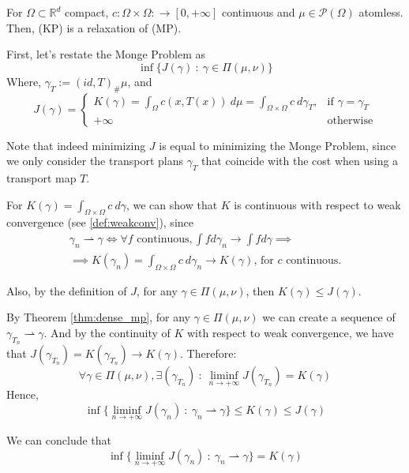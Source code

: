 \begin{theorem}
  For $\Omega \subset \mathbb R^d$ compact,
  $c:\Omega\times \Omega: \to [0,+\infty]$ continuous and
  $\mu \in \mathcal P(\Omega)$ atomless. Then, (KP) is a relaxation
  of (MP).
\end{theorem}
\begin{prf}
  First, let's restate the Monge Problem as
  \begin{equation*}
    \inf \{J(\gamma) \ : \ \gamma \in \Pi(\mu,\nu)\}
  \end{equation*}
  Where, $\gamma_T := (id,T)_\# \mu$, and
  \begin{equation*}
    J(\gamma)  =
    \begin{cases}
      K(\gamma)=
      \int_{\Omega} c(x,T(x)) \ d\mu =
      \int_{\Omega \times \Omega}c \ d\gamma_T,
              & \text{if } \gamma = \gamma_T \\
      +\infty & \text{otherwise}
    \end{cases}
  \end{equation*}

  Note that indeed minimizing $J$ is equal to minimizing the
  Monge Problem, since we only consider the transport plans
  $\gamma_T$ that coincide with the cost when using a transport map
  $T$.

  For $K(\gamma) = \int_{\Omega \times \Omega} c \ d\gamma$,
  we can show that $K$ is continuous with respect to weak convergence (see \ref{def:weakconv}), since
  \begin{align*}
    \gamma_n \rightharpoonup \gamma \iff
    \forall f \text{ continuous}, \int f d\gamma_n \to \int f d\gamma
    \implies
    \\
    \implies
    K(\gamma_n) = \int_{\Omega \times \Omega} c \ d\gamma_n \to
    K(\gamma)\text{, for } c \text{ continuous.}
  \end{align*}

  Also, by the definition of $J$, for any $\gamma \in \Pi(\mu,\nu)$, then $K(\gamma) \leq J(\gamma)$.

  By Theorem \ref{thm:dense_mp}, for any
  $\gamma \in \Pi(\mu,\nu)$ we can create a sequence of
  $\gamma_{T_n}\rightharpoonup \gamma$. And by the continuity
  of $K$ with respect to weak convergence, we have that $J(\gamma_{T_n})=K(\gamma_{T_n})\to
    K(\gamma)$. Therefore:
  \begin{equation*}
    \forall \gamma \in \Pi(\mu,\nu), \exists (\gamma_{T_n})\ : \
    \liminf_{n\to +\infty} J(\gamma_{T_n})= K(\gamma)
  \end{equation*}
  Hence,
  \begin{equation*}
    \inf\{
    \liminf_{n\to +\infty} J(\gamma_{n}) \ :
    \ \gamma_n \rightharpoonup \gamma
    \}\leq K(\gamma) \leq J(\gamma)
  \end{equation*}

  We can conclude that
  \begin{equation*}
    \inf\{
    \liminf_{n\to +\infty} J(\gamma_{n}) \ :
    \ \gamma_n \rightharpoonup \gamma
    \} = K(\gamma)
  \end{equation*}

\end{prf}


